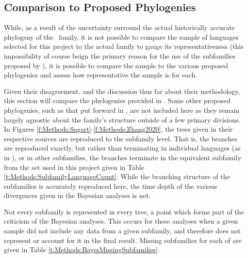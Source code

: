 \subsection{Comparison to Proposed Phylogenies}\label{ss:Methods:Bayesian}
While, as a result of the uncertainty surround the actual historically accurate phylogeny of the \lfam\ family, it is not possible to compare the sample of languages selected for this project to the actual family to gauge its representativeness (this impossibility of course beign the primary reason for the use of the subfamilies proposed by ), it is possible to compare the sample to the various proposed phylogenies and assess how representative the sample is for each.

Given their disagreement, and the discussion thus far about their methodology, this section will compare the phylogenies provided in . Some other proposed phylogenies, such as that put forward in , are not included here as they remain largely agnostic about the family's structure outside of a few primary divisions. In Figures \ref{f:Methods:Sagart}-\ref{f:Methods:Zhang2020}, the trees given in their respective sources are reproduced to the subfamily level. That is, the branches are reproduced exactly, but rather than terminating in individual languages (as in ), or in other subfamilies, the branches terminate in the equivalent subfamily from the set used in this project given in Table \ref{t:Methods:SubfamilyLanguageCount}. While the branching structure of the subfamilies is accurately reproduced here, the time depth of the various divergences given in the Bayesian analyses is not.

Not every subfamily is represented in every tree, a point which forms part of the criticism of the Bayesian analyses. This occurs for these analyses when a given sample did not include any data from a given subfamily, and therefore does not represent or account for it in the final result. Missing subfamilies for each of  are given in Table \ref{t:Methods:BayesMissingSubfamilies}.

